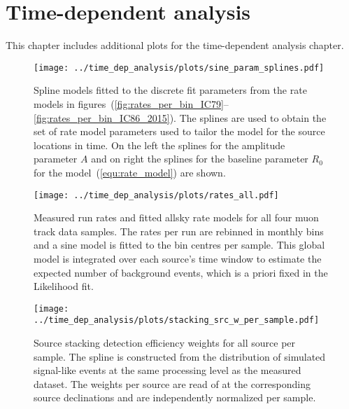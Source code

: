 \section{Time-dependent analysis}
This chapter includes additional plots for the time-dependent analysis chapter.

\enlargethispage*{5cm}
\begin{figure}[H]
  \centering
  \texttt{[image: ../time\_dep\_analysis/plots/sine\_param\_splines.pdf]}
  \caption[Parameter splines for the sine rate model per sample]{
    Spline models fitted to the discrete fit parameters from the rate models in figures~(\ref{fig:rates_per_bin_IC79}--\ref{fig:rates_per_bin_IC86_2015}).
    The splines are used to obtain the set of rate model parameters used to tailor the model for the source locations in time.
    On the left the splines for the amplitude parameter $A$ and on right the splines for the baseline parameter $R_0$ for the model~(\ref{equ:rate_model}) are shown.
  }
  \label{fig:tdep_sine_param_splines}
\end{figure}

\begin{figure}[H]
  \centering
  \texttt{[image: ../time\_dep\_analysis/plots/rates\_all.pdf]}
  \caption[Total run rates and sine models for all samples]{
    Measured run rates and fitted allsky rate models for all four muon track data samples.
    The rates per run are rebinned in monthly bins and a sine model is fitted to the bin centres per sample.
    This global model is integrated over each source's time window to estimate the expected number of background events, which is a priori fixed in the Likelihood fit.
  }
  \label{fig:rates_all}
\end{figure}
\enlargethispage*{5cm}
\begin{figure}[H]
  \centering
  \texttt{[image: ../time\_dep\_analysis/plots/stacking\_src\_w\_per\_sample.pdf]}
  \caption[Source stacking weights for the time-dependent analysis]{
    Source stacking detection efficiency weights for all source per sample.
    The spline is constructed from the distribution of simulated signal-like events at the same processing level as the measured dataset.
    The weights per source are read of at the corresponding source declinations and are independently normalized per sample.
  }
  \label{fig:tdep_stacking_src_w_per_sample}
\end{figure}

